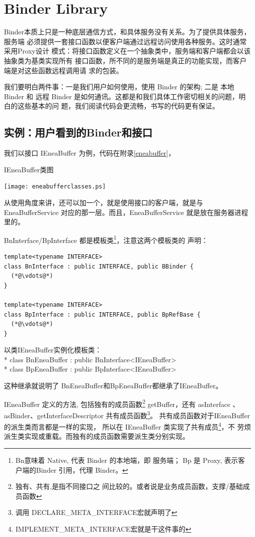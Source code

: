 \documentclass[a4paper,11pt]{article}
\begin{document}
\section{Binder Library}
Binder本质上只是一种底层通信方式，和具体服务没有关系。为了提供具体服务，服务端
必须提供一套接口函数以便客户端通过远程访问使用各种服务。这时通常采用Proxy设计
模式：将接口函数定义在一个抽象类中，服务端和客户端都会以该抽象类为基类实现所有
接口函数，所不同的是服务端是真正的功能实现，而客户端是对这些函数远程调用请
求的包装。

我们要明白两件事：一是我们用户如何使用，使用 Binder 的架构; 二是 本地Binder 和
远程 Binder 是如何通讯。这都是和我们具体工作密切相关的问题，明白的这些基本的问
题，我们阅读代码会更流畅，书写的代码更有保证。

\subsection{实例：用户看到的Binder和接口}

我们以接口 IEneaBuffer 为例，代码在附录\autoref{eneabuffer}，

\caption{IEneaBuffer类图}
\texttt{[image: eneabufferclasses.ps]}

从使用角度来讲，还可以加一个，就是使用接口的客户端，就是与 EneaBufferService
对应的那一层。而且，EneaBufferService 就是放在服务器进程里的。

BnInterface/BpInterface 都是模板类\footnote{Bn意味着 Native, 代表 Binder 的本地端，即
服务端； Bp 是 Proxy, 表示客户端的Binder 引用，代理 Binder。}，注意这两个模板类的
声明：
\begin{lstlisting}
template<typename INTERFACE>
class BnInterface : public INTERFACE, public BBinder {
  (*@\vdots@*)
}

template<typename INTERFACE>
class BpInterface : public INTERFACE, public BpRefBase {
  (*@\vdots@*)
}
\end{lstlisting}

以类IEneaBuffer实例化模板类：\\*
class BnEneaBuffer : public BnInterface<IEneaBuffer> \\*
class BpEneaBuffer : public BpInterface<IEneaBuffer> 

这种继承就说明了 BnEneaBuffer和BpEneaBuffer都继承了IEneaBuffer。

IEneaBuffer 定义的方法, 包括独有的成员函数\footnote{独有、共有,是指不同接口之
间比较的。或者说是业务成员函数，支撑/基础成员函数} getBuffer，还有 asInterface
、asBinder、getInterfaceDescriptor 共有成员函数\footnote{调用
DECLARE_META_INTERFACE宏就声明了}。
共有成员函数对于IEneaBuffer的派生类而言都是一样的实现，
所以在 IEneaBuffer 类实现了共有成员\footnote{IMPLEMENT_META_INTERFACE宏就是干这件事的}，不
劳烦派生类实现或重载。而独有的成员函数需要派生类分别实现。
\end{document}
